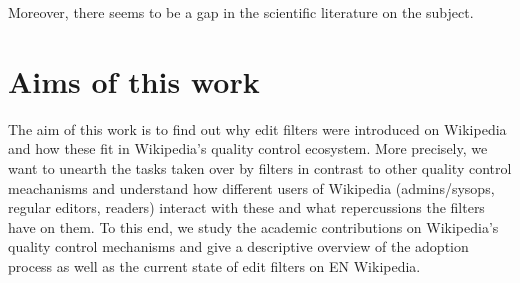 Moreover, there seems to be a gap in the scientific literature on the subject.

\begin{comment}
\section{Algorithmic Governance}

should be mentioned here;
it's important for framing along with Lessig's "Code is law".

algorithmic governance?/socio-technical assemblage
* humans
* software
* tech. infrastructure

\cite{GeiHal2017}

Claudia's paper:
"“In both cases of algorithmic governance
– software features and bots – making rules part of the infrastructure, to a certain extent, makes
them harder to change and easier to enforce” (p. 87)"

\end{comment}
\section{Aims of this work}

The aim of this work is to find out why edit filters were introduced on Wikipedia and how these fit in Wikipedia's quality control ecosystem.
More precisely, we want to unearth the tasks taken over by filters in contrast to other quality control meachanisms
and understand how different users of Wikipedia (admins/sysops, regular editors, readers) interact with these and what repercussions the filters have on them.
To this end, we study the academic contributions on Wikipedia's quality control mechanisms and give a descriptive overview of the adoption process as well as the current state of edit filters on EN Wikipedia.


